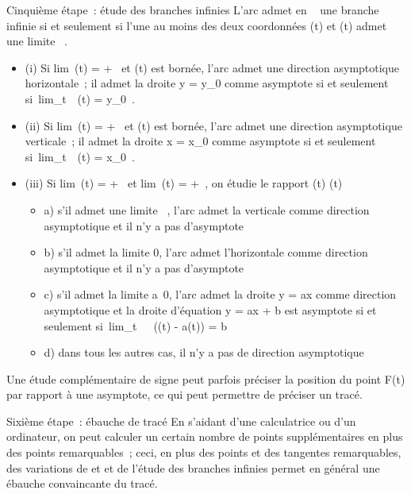 \documentclass[]{article}
\begin{document}
Cinquième étape~: étude des branches infinies L'arc admet en \alpha~
\in\overlineD une branche infinie si et seulement si
l'une au moins des deux coordonnées \phi(t) et \psi(t) admet une limite \infty~.

\begin{itemize}
\itemsep1pt\parskip0pt
\item
  (i) Si lim~\phi(t) = +\infty~ et
  \psi(t) est bornée, l'arc admet une direction asymptotique horizontale~;
  il admet la droite y = y_0 comme asymptote si et seulement
  si~lim_t\rightarrow~\alpha~\psi(t) = y_0~.
\item
  (ii) Si lim~\psi(t) = +\infty~ et
  \phi(t) est bornée, l'arc admet une direction asymptotique verticale~; il
  admet la droite x = x_0 comme asymptote si et seulement
  si~lim_t\rightarrow~\alpha~\phi(t) = x_0~.
\item
  (iii) Si lim~\phi(t) = +\infty~ et
  lim~\psi(t) = +\infty~, on étudie
  le rapport  \psi(t) \over \phi(t)

  \begin{itemize}
  \itemsep1pt\parskip0pt
  \item
    a) s'il admet une limite \infty~, l'arc admet la verticale comme direction
    asymptotique et il n'y a pas d'asymptote
  \item
    b) s'il admet la limite 0, l'arc admet l'horizontale comme direction
    asymptotique et il n'y a pas d'asymptote
  \item
    c) s'il admet la limite a\neq~0, l'arc admet
    la droite y = ax comme direction asymptotique et la droite
    d'équation y = ax + b est asymptote si et seulement
    si~lim_t\rightarrow~\alpha~~(\psi(t) - a\phi(t)) = b
  \item
    d) dans tous les autres cas, il n'y a pas de direction asymptotique
  \end{itemize}
\end{itemize}

Une étude complémentaire de signe peut parfois préciser la position du
point F(t) par rapport à une asymptote, ce qui peut permettre de
préciser un tracé.

Sixième étape~: ébauche de tracé En s'aidant d'une calculatrice ou d'un
ordinateur, on peut calculer un certain nombre de points supplémentaires
en plus des points remarquables~; ceci, en plus des points et des
tangentes remarquables, des variations de \phi et \psi et de l'étude des
branches infinies permet en général une ébauche convaincante du tracé.
\end{document}
